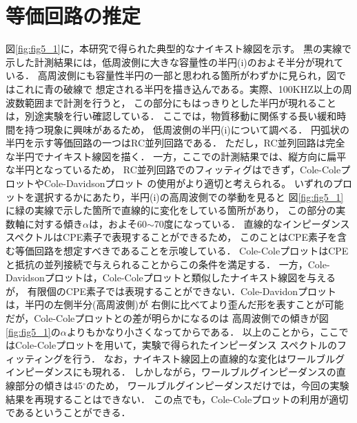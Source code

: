 \section{等価回路の推定}
図\ref{fig:fig5_1}に，本研究で得られた典型的なナイキスト線図を示す。
黒の実線で示した計測結果には，低周波側に大きな容量性の半円(i)のおよそ半分が現れている．
高周波側にも容量性半円の一部と思われる箇所がわずかに見られ，図ではこれに青の破線で
想定される半円を描き込んである。実際、100KHZ以上の周波数範囲まで計測を行うと，
この部分にもはっきりとした半円が現れることは，別途実験を行い確認している．
ここでは，物質移動に関係する長い緩和時間を持つ現象に興味があるため，
低周波側の半円(i)について調べる．
円弧状の半円を示す等価回路の一つはRC並列回路である．
ただし，RC並列回路は完全な半円でナイキスト線図を描く．
一方，ここでの計測結果では、縦方向に扁平な半円となっているため，
RC並列回路でのフィッティグはできず，Cole-ColeプロットやCole-Davidsonプロット
の使用がより適切と考えられる。
いずれのプロットを選択するかにあたり，半円(i)の高周波側での挙動を見ると
図\ref{fig:fig5_1}に緑の実線で示した箇所で直線的に変化をしている箇所があり，
この部分の実数軸に対する傾き$\alpha$は，およそ60$\sim$70度になっている．
直線的なインピーダンススペクトルはCPE素子で表現することができるため，
このことはCPE素子を含む等価回路を想定すべきであることを示唆している．
Cole-ColeプロットはCPEと抵抗の並列接続で与えられることからこの条件を満足する．
一方，Cole-Davidsonプロットは，Cole-Coleプロットと類似したナイキスト線図を与えるが，
有限個のCPE素子では表現することができない．Cole-Davidonプロットは，半円の左側半分(高周波側)が
右側に比べてより歪んだ形を表すことが可能だが，Cole-Coleプロットとの差が明らかになるのは
高周波側での傾きが図\ref{fig:fig5_1}の$\alpha$よりもかなり小さくなってからである．
以上のことから，ここではCole-Coleプロットを用いて，実験で得られたインピーダンス
スペクトルのフィッティングを行う．
なお，ナイキスト線図上の直線的な変化はワールブルグインピーダンスにも現れる．
しかしながら，ワールブルグインピーダンスの直線部分の傾きは45$^\circ$のため，
ワールブルグインピーダンスだけでは，今回の実験結果を再現することはできない．
この点でも，Cole-Coleプロットの利用が適切であるということができる．

